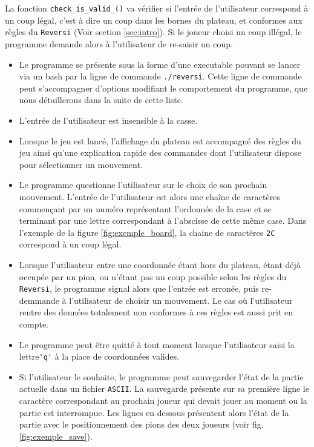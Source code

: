 \documentclass[10pt,a4paper]{article}
\begin{document}
La fonction \verb!check_is_valid_()! va vérifier si l'entrée de l'utilisateur correspond à un coup légal, c'est à dire un coup dans les bornes du plateau, et conformes aux règles du \verb!Reversi! (Voir section \ref{sec:intro}). Si le joueur choisi un coup illégal, le programme demande alors à l'utilisateur de re-saisir un coup.\\
\begin{itemize}
\item Le programme se présente sous la forme d'une executable pouvant se lancer via un bash par la ligne de commande \verb!./reversi!. Cette ligne de commande peut s'accompagner d'options modifiant le comportement du programme, que nous détaillerons dans la suite de cette liste.
\item L'entrée de l'utilisateur est insensible à la casse.
\item Lorsque le jeu est lancé, l'affichage du plateau est accompagné des règles du jeu ainsi qu'une explication rapide des commandes dont l'utilisateur dispose pour sélectionner un mouvement.
\item Le programme questionne l'utilisateur sur le choix de son prochain mouvement. L'entrée de l'utilisateur est alors une chaîne de caractères commençant par un numéro représentant l'ordonnée de la case et se terminant par une lettre correspondant à l'abscisse de cette même case. Dans l'exemple de la figure \ref{fig:exemple_board}, la chaine de caractères \verb!2C! correspond à un coup légal.
\item Lorsque l'utilisateur entre une coordonnée étant hors du plateau, étant déjà occupée par un pion, ou n'étant pas un coup possible selon les règles du \verb!Reversi!, le programme signal alors que l'entrée est erronée, puis re-demmande à l'utilisateur de choisir un mouvement. Le cas où l'utilisateur rentre des données totalement non conformes à ces règles est aussi prit en compte.
\item Le programme peut être quitté à tout moment lorsque l'utilisateur saisi la lettre\verb!'q'! à la place de coordonnées valides.
\item Si l'utilisateur le souhaite, le programme peut sauvegarder l'état de la partie actuelle dans un fichier \verb!ASCII!. La sauvegarde présente sur sa première ligne le caractère correspondant au prochain joueur qui devait jouer au moment ou la partie est interrompue. Les lignes en dessous présentent alors l'état de la partie avec le positionnement des pions des deux joueurs (voir fig. \ref{fig:exemple_save}).

\end{itemize}
\end{document}
